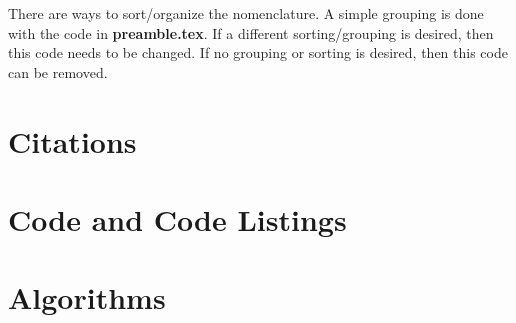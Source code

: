     There are ways to sort/organize the nomenclature.
    A simple grouping is done with the code in \textbf{preamble.tex}.
    If a different sorting/grouping is desired, then this code needs to be changed.
    If no grouping or sorting is desired, then this code can be removed.

\section{Citations} \label{sec:Citations}

\section{Code and Code Listings} \label{sec:CodeAndCodeListings}

\section{Algorithms} \label{sec:Algorithms}
